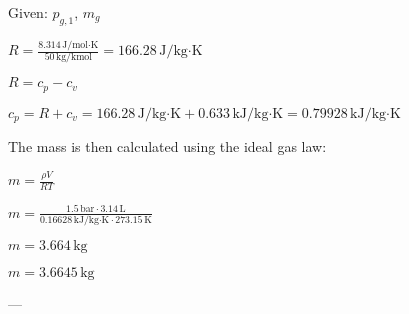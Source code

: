 Given: \( p_{g,1} \), \( m_g \)  

\( R = \frac{8.314 \, \text{J/mol·K}}{50 \, \text{kg/kmol}} = 166.28 \, \text{J/kg·K} \)  

\( R = c_p - c_v \)  

\( c_p = R + c_v = 166.28 \, \text{J/kg·K} + 0.633 \, \text{kJ/kg·K} = 0.79928 \, \text{kJ/kg·K} \)  

The mass is then calculated using the ideal gas law:  

\( m = \frac{\rho V}{R T} \)  

\( m = \frac{1.5 \, \text{bar} \cdot 3.14 \, \text{L}}{0.16628 \, \text{kJ/kg·K} \cdot 273.15 \, \text{K}} \)  

\( m = 3.664 \, \text{kg} \)  

\( m = 3.6645 \, \text{kg} \)  

---